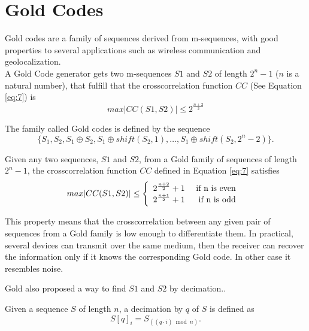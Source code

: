 \section{Gold Codes}

Gold codes\cite{gold_codes} are a family of sequences derived from
m-sequences, with good properties to several
applications such as wireless communication and geolocalization.\\

A Gold Code generator gets two m-sequences $S1$ and $S2$  of length
 $2^{n}-1$ ($n$ is a natural number), that fulfill that the crosscorrelation function $CC$ (See Equation \eqref{eq:7}) is 
  \begin{equation}\label{gold:eq:1}
      max |CC(S1, S2)| \leq 2^{\frac{n+2}{2}}
    \end{equation}

The family called Gold codes is defined by the sequence 
$$
\{S_1, S_2, S_1\oplus S_2, S_1\oplus shift(S_2, 1), \ldots, S_1\oplus shift(S_2,2^n-2)\}.
$$


\begin{property}
  Given any two sequences, $S1$ and $S2$, from a Gold family of sequences of length
  $2^{n}-1$,  the crosscorrelation function $CC$ defined in Equation \eqref{eq:7} satisfies 
  \begin{equation}
        max |CC(S1, S2)| \leq \left\{\begin{array}{lr}
            2^{\frac{n+2}{2}}+1 & \textnormal{ if n is even } \\
            2^{\frac{n+1}{2}}+1 & \textnormal{ if n is odd } \\
        \end{array}\right.
  \end{equation}
\end{property}

This property means that the crosscorrelation between any given pair of
sequences from a Gold family is low enough to differentiate them.
 In practical, several devices can transmit over the same medium, then the receiver can recover the information only if it knows the corresponding Gold code. In other case it  resembles noise.

Gold also proposed  a way to find $S1$ and $S2$ by decimation..

\begin{definition}[Decimation]
  Given a sequence $S$ of length $n$, a decimation by $q$ of $S$ is defined as
  \begin{equation}
    S[q]_{i} = S_{((q·i) \bmod n)}.
  \end{equation}
\end{definition}

